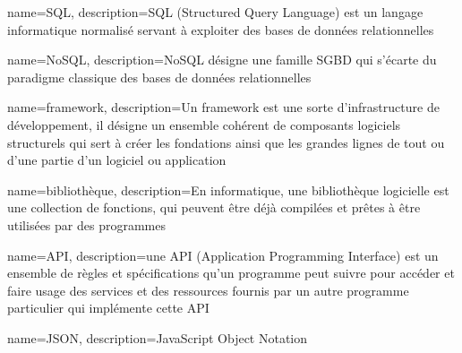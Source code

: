 {
    name=SQL,
    description={SQL (Structured Query Language) est un langage informatique normalisé servant à exploiter des bases de données relationnelles}
}

{
    name=NoSQL,
    description={NoSQL désigne une famille SGBD qui s'écarte du paradigme classique des bases de données relationnelles}
}

{
    name=framework,
    description={Un framework est une sorte d'infrastructure de développement, il désigne un ensemble cohérent de composants logiciels structurels qui sert à créer les fondations ainsi que les grandes lignes de tout ou d'une partie d'un logiciel ou application}
}

{
    name=bibliothèque,
    description={En informatique, une bibliothèque logicielle est une collection de fonctions, qui peuvent être déjà compilées et prêtes à être utilisées par des programmes}
}

{
    name=API,
    description={une API (Application Programming Interface) est un ensemble de règles et spécifications qu'un programme peut suivre pour accéder et faire usage des services et des ressources fournis par un autre programme particulier qui implémente cette API}
}

{
    name=JSON,
    description={JavaScript Object Notation}
}